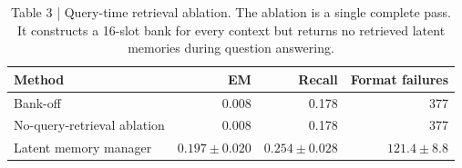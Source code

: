 \begin{table}[t]
\centering
\begin{tabular}{lrrr}
\toprule
Method & EM & Recall & Format failures \\
\midrule
Bank-off & 0.008 & 0.178 & 377 \\
No-query-retrieval ablation & 0.008 & 0.178 & 377 \\
Latent memory manager & $0.197\pm0.020$ & $0.254\pm0.028$ & $121.4\pm8.8$ \\
\bottomrule
\end{tabular}
\caption{Table 3 | Query-time retrieval ablation. The ablation is a single complete pass. It constructs a 16-slot bank for every context but returns no retrieved latent memories during question answering.}
\label{tab:query-time-retrieval-ablation}
\end{table}
